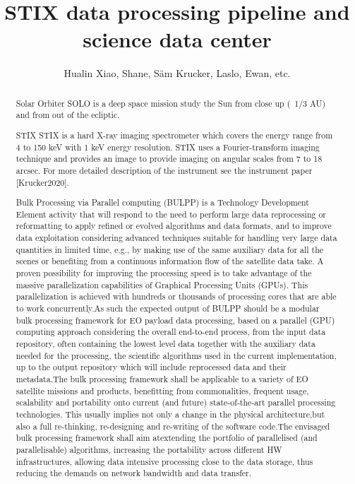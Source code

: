 \documentclass[a4paper,10pt]{article}
\title{STIX data processing pipeline and science data center}
\author{Hualin Xiao, Shane, S\"am Krucker, Laslo, Ewan, etc. }
\begin{document}
\maketitle

\begin{abstract}
Solar Orbiter
SOLO is a deep space mission study the Sun from close up (~1/3 AU) and from out of the ecliptic.

STIX
STIX is a hard X-ray imaging spectrometer which covers the energy range from 4 to 150 keV with 1 keV energy resolution. STIX uses a Fourier-transform imaging technique and provides an image to provide imaging on angular scales from 7 to 18 arcsec. For more detailed description of the instrument see the instrument paper [Krucker2020].


Bulk Processing via Parallel computing (BULPP) is a Technology Development 
Element activity that will respond to the need to perform large data 
reprocessing or reformatting to apply refined or evolved algorithms and data 
formats, and to improve data exploitation considering advanced techniques 
suitable for handling very large data quantities in limited time, e.g., by 
making use of the same auxiliary data for all the scenes or benefiting from a 
continuous information flow of the satellite data take. A proven possibility 
for improving the processing speed is to take advantage of the massive 
parallelization capabilities of Graphical Processing Units (GPUs). This 
parallelization is achieved with hundreds or thousands of processing cores 
that are able to work concurrently.As such the expected output of BULPP should 
be a modular bulk processing framework for EO payload data processing, based 
on a parallel (GPU) computing approach considering the overall end-to-end 
process, from the input data repository, often containing the lowest level 
data together with the auxiliary data needed for the processing, the 
scientific algorithms used in the current implementation, up to the output 
repository which will include reprocessed data and their metadata.The bulk 
processing framework shall be applicable to a variety of EO satellite missions 
and products, benefitting from commonalities, frequent usage, scalability and 
portability onto current (and future) state-of-the-art parallel processing 
technologies. This usually implies not only a change in the physical 
architecture,but also a full re-thinking, re-designing and re-writing of the 
software code.The envisaged bulk processing framework shall aim atextending 
the portfolio of parallelised (and parallelisable) algorithms, increasing the 
portability across different HW infrastructures, allowing data intensive 
processing close to the data storage, thus reducing the demands on network 
bandwidth and data transfer.
 

\end{abstract}
\end{document}
